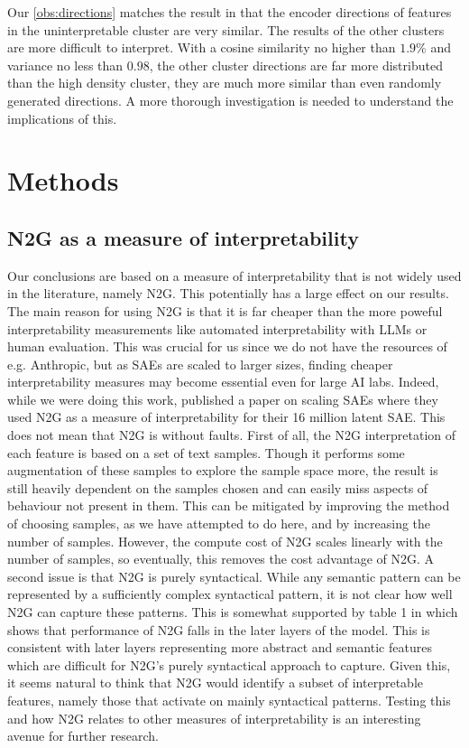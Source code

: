 Our \ref{obs:directions} matches the result in \textcite{nanda_open_2023} that the encoder directions of features in the uninterpretable cluster are very similar.
The results of the other clusters are more difficult to interpret.
With a cosine similarity no higher than $1.9\%$ and variance no less than $0.98$, the other cluster directions are far more distributed than the high density cluster, they are much more similar than even randomly generated directions.
A more thorough investigation is needed to understand the implications of this.



\section{Methods}
\subsection{N2G as a measure of interpretability}
\label{sec:n2g_interpretability}
Our conclusions are based on a measure of interpretability that is not widely used in the literature, namely N2G.
This potentially has a large effect on our results.
The main reason for using N2G is that it is far cheaper than the more poweful interpretability measurements like automated interpretability with LLMs or human evaluation.
This was crucial for us since we do not have the resources of e.g. Anthropic, but as SAEs are scaled to larger sizes, finding cheaper interpretability measures may become essential even for large AI labs.
Indeed, while we were doing this work, \textcite{gao_scaling_2024} published a paper on scaling SAEs where they used N2G as a measure of interpretability for their 16 million latent SAE.
This does not mean that N2G is without faults.
First of all, the N2G interpretation of each feature is based on a set of text samples.
Though it performs some augmentation of these samples to explore the sample space more, the result is still heavily dependent on the samples chosen and can easily miss aspects of behaviour not present in them.
This can be mitigated by improving the method of choosing samples, as we have attempted to do here, and by increasing the number of samples.
However, the compute cost of N2G scales linearly with the number of samples, so eventually, this removes the cost advantage of N2G.
A second issue is that N2G is purely syntactical.
While any semantic pattern can be represented by a sufficiently complex syntactical pattern, it is not clear how well N2G can capture these patterns.
This is somewhat supported by table 1 in \textcite{foote_neuron_2023} which shows that performance of N2G falls in the later layers of the model.
This is consistent with later layers representing more abstract and semantic features which are difficult for N2G's purely syntactical approach to capture.
Given this, it seems natural to think that N2G would identify a subset of interpretable features, namely those that activate on mainly syntactical patterns.
Testing this and how N2G relates to other measures of interpretability is an interesting avenue for further research.

